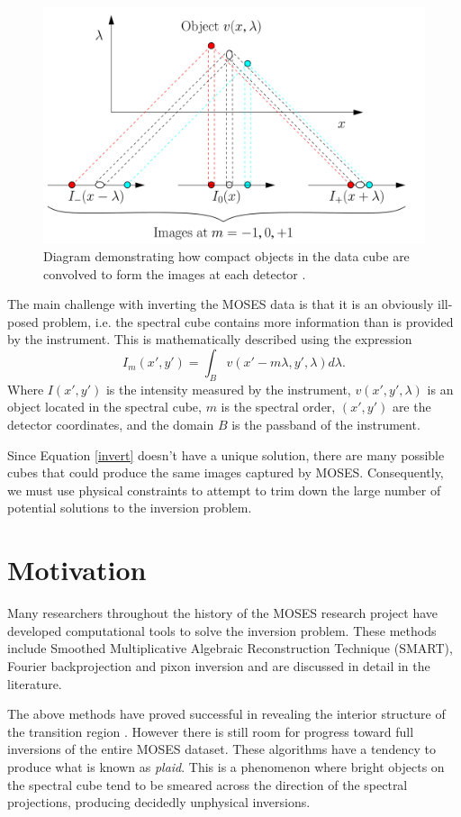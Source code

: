\documentclass[twoside]{article}
\begin{document}
\begin{multicols}{2}
\begin{figure}[H]
	\includegraphics[width=\linewidth]{images/inversion}
	\caption{Diagram demonstrating how compact objects in the data cube are convolved to form the images at each detector \cite{moses}.}
	\label{inversion}
\end{figure}
The main challenge with inverting the MOSES data is that it is an obviously ill-posed problem, i.e. the spectral cube contains more information than is provided by the instrument. This is mathematically described using the expression
\begin{equation}
I_m(x',y') = \int_B v(x'-m \lambda,y',\lambda)d\lambda. \label{invert}
\end{equation}
Where $I(x',y')$ is the intensity measured by the instrument, $v(x',y',\lambda)$ is an object located in the spectral cube, $m$ is the spectral order, $(x',y')$ are the detector coordinates, and the domain $B$ is the passband of the instrument. 
\par Since Equation \eqref{invert} doesn't have a unique solution, there are many possible cubes that could produce the same images captured by MOSES. Consequently, we must use physical constraints to attempt to trim down the large number of potential solutions to the inversion problem. \par 

\section{Motivation}

Many researchers throughout the history of the MOSES research project have developed computational tools to solve the inversion problem. These methods include Smoothed Multiplicative Algebraic Reconstruction Technique (SMART)\cite{smart}, Fourier backprojection and pixon inversion \cite{inversion} and are discussed in detail in the literature. 
\par The above methods have proved successful in revealing the interior structure of the transition region \cite{moses}. However there is still room for progress toward full inversions of the entire MOSES dataset. These algorithms have a tendency to produce what is known as \textit{plaid}. This is a phenomenon where bright objects on the spectral cube tend to be smeared across the direction of the spectral projections, producing decidedly unphysical inversions.


\end{multicols}
\end{document}
